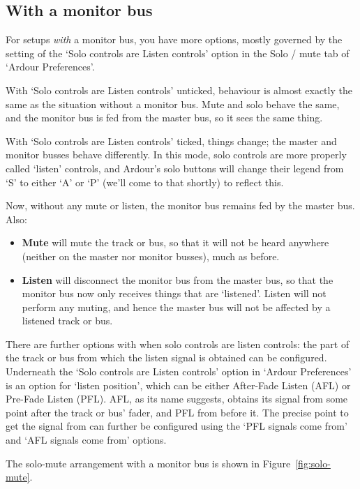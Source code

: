 \documentclass[10pt,a4paper]{book}
\newcommand{\tab}[1]{#1}
\begin{document}
\subsection{With a monitor bus}

For setups \emph{with} a monitor bus, you have more options, mostly
governed by the setting of the `Solo controls are Listen controls'
option in the \tab{Solo / mute} tab of `Ardour Preferences'.

With `Solo controls are Listen controls' unticked, behaviour is almost
exactly the same as the situation without a monitor bus.  Mute and
solo behave the same, and the monitor bus is fed from the master bus,
so it sees the same thing.

With `Solo controls are Listen controls' ticked, things change; the
master and monitor busses behave differently.  In this mode, solo
controls are more properly called `listen' controls, and Ardour's solo
buttons will change their legend from `S' to either `A' or `P' (we'll
come to that shortly) to reflect this.

Now, without any mute or listen, the monitor bus remains fed by the
master bus.  Also:

\begin{itemize}
\item \textbf{Mute} will mute the track or bus, so that it will not be
  heard anywhere (neither on the master nor monitor busses), much as before.
\item \textbf{Listen} will disconnect the monitor bus from the master
  bus, so that the monitor bus now only receives things that are
  `listened'.  Listen will not perform any muting, and hence the
  master bus will not be affected by a listened track or bus.
\end{itemize}

There are further options with when solo controls are listen controls:
the part of the track or bus from which the listen signal is obtained
can be configured.  Underneath the `Solo controls are Listen controls'
option in `Ardour Preferences' is an option for `listen position',
which can be either After-Fade Listen (AFL) or Pre-Fade Listen (PFL).
AFL, as its name suggests, obtains its signal from some point after
the track or bus' fader, and PFL from before it.  The precise point to
get the signal from can further be configured using the `PFL signals
come from' and `AFL signals come from' options.

The solo-mute arrangement with a monitor bus is shown in Figure~\ref{fig:solo-mute}.
\end{document}
